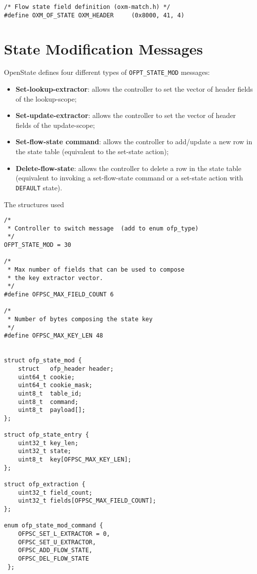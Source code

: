 \begin{verbatim}
/* Flow state field definition (oxm-match.h) */
#define OXM_OF_STATE OXM_HEADER     (0x8000, 41, 4)
\end{verbatim}

\section{State Modification Messages}
\label{sec:msg_set_state}

OpenState defines four different types of \texttt{OFPT\_STATE\_MOD} messages: 
\begin{itemize}
\setlength\itemsep{0em}
\item \textbf{Set-lookup-extractor}: allows the controller to set the vector of header fields of the lookup-scope;
\item \textbf{Set-update-extractor}: allows the controller to set the vector of header fields of the update-scope;
\item \textbf{Set-flow-state command}: allows the controller to add/update a new row in the state table (equivalent to the set-state action);
\item \textbf{Delete-flow-state}: allows the controller to delete a row in the state table (equivalent to invoking a  set-flow-state command or a set-state action with \texttt{DEFAULT} state).
\end{itemize}

The structures used

\begin{verbatim}
/*
 * Controller to switch message  (add to enum ofp_type)
 */
OFPT_STATE_MOD = 30

/*
 * Max number of fields that can be used to compose
 * the key extractor vector.
 */
#define OFPSC_MAX_FIELD_COUNT 6

/*
 * Number of bytes composing the state key
 */
#define OFPSC_MAX_KEY_LEN 48


struct ofp_state_mod {
    struct   ofp_header header;
    uint64_t cookie;
    uint64_t cookie_mask;
    uint8_t  table_id;
    uint8_t  command;
    uint8_t  payload[];
};

struct ofp_state_entry {
    uint32_t key_len;
    uint32_t state;
    uint8_t  key[OFPSC_MAX_KEY_LEN];
};

struct ofp_extraction {
    uint32_t field_count;
    uint32_t fields[OFPSC_MAX_FIELD_COUNT];
};

enum ofp_state_mod_command {
	OFPSC_SET_L_EXTRACTOR = 0,
	OFPSC_SET_U_EXTRACTOR,
	OFPSC_ADD_FLOW_STATE,	
	OFPSC_DEL_FLOW_STATE
 };

\end{verbatim}

